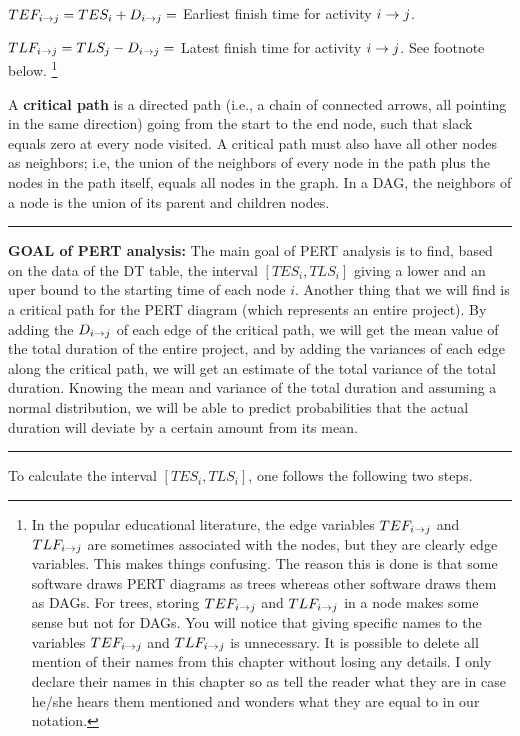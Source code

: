 $TEF_{i\rightarrow j}=TES_i + D_{i\rightarrow j}=$ 
Earliest finish 
time for activity $i\rightarrow j$.

$TLF_{i\rightarrow j}=TLS_j-D_{i\rightarrow j}=$ 
 Latest finish 
time for activity $i\rightarrow j$. See footnote below.
\footnote{
In the popular educational literature,
the edge variables
$TEF_{i\rightarrow j}$
and $TLF_{i\rightarrow j}$
are sometimes associated 
 with
the nodes, but they 
are clearly edge variables.
This makes things confusing.
The reason this is done is
that some software draws PERT diagrams as
trees whereas other software
draws them as DAGs. For trees,
storing $TEF_{i\rightarrow j}$
and $TLF_{i\rightarrow j}$ in a node
makes some sense but not for DAGs.
You will notice that giving specific names
to the variables
$TEF_{i\rightarrow j}$
and $TLF_{i\rightarrow j}$ 
is  unnecessary.
It is possible
to delete all 
mention of their names 
from this chapter
without
losing any details. I only declare
their names 
in this chapter so as tell the reader 
what they are in case he/she
hears them mentioned
and wonders what they are
equal to in our notation.}



A {\bf critical path} is a directed path
(i.e., a chain of connected arrows,
all pointing in the same direction)
going from the start  to the end node, such that 
slack equals zero at every node visited.
A critical path must also have all other nodes 
as neighbors; i.e, 
the union of the neighbors
of  every node in the path  plus
the nodes in the path itself, equals 
all nodes in the graph. In a DAG, the neighbors
of a node is the union of its parent and children nodes.

\hrule
{\bf GOAL of PERT analysis:} The main
goal
of PERT analysis
is to find,
based on the data of the DT table, 
the interval $[TES_i, TLS_i]$
giving 
a lower and an uper bound
to the starting time of each node $i$.
Another thing that
we will
find is a critical path
for the PERT diagram (which
represents  an entire project).
By adding the $D_{i\rightarrow j}$
of each edge of the
critical path,
we will
get the mean value of the total
duration
of the entire project,
and by adding the
variances of each 
edge along the critical path,
we will get an estimate
of the total variance
of the total duration.
Knowing the mean and variance
of the total
duration
and assuming a normal distribution,
we will be able to
predict probabilities
that the 
actual duration
will
deviate by a certain amount from its mean.
\hrule

To calculate the interval $[TES_i, TLS_i]$,
one follows the
following two steps.


